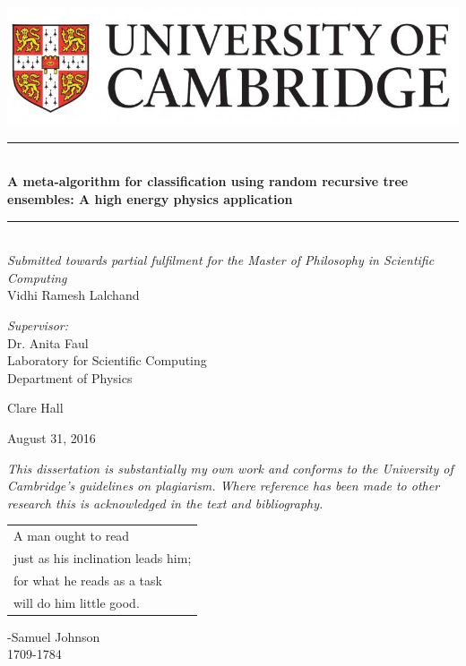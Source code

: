 \documentclass[a4paper,twoside]{report}
\newcommand\textline[4][t]{%
  \par\smallskip\noindent\parbox[#1]{.600\textwidth}{\raggedright #2}%
  \parbox[#1]{.333\textwidth}{\centering#3}%
  \parbox[#1]{.333\textwidth}{\raggedleft #4}\par\smallskip%
}
\begin{document}
\begin{titlepage}
\begin{center}

\includegraphics[scale=0.3]{images/Camlogo.jpg}

\vspace{15mm}
\noindent\rule{14cm}{0.4pt}
\vspace{0.1pt}\\
\textbf{\Large A meta-algorithm for classification using random recursive tree ensembles: A high energy physics application}
\vspace{0.1pt}\\
\noindent\rule{14cm}{0.4pt}\\
\vspace{20mm}
\textit{Submitted towards partial fulfilment for the Master of Philosophy in Scientific Computing}\\
\vspace{30mm}
\large{Vidhi Ramesh Lalchand}\\
\vspace{6mm}
\end{center}
\vspace{45mm}
\textline[t]{
\textit{Supervisor:} \\
Dr. Anita Faul \\
Laboratory for Scientific Computing\\
Department of Physics\\
}{}{Clare Hall}
\vspace{10mm}
\begin{center}
August 31, 2016
\end{center}
\end{titlepage}

\thispagestyle{empty}
\textit{This dissertation is substantially my own work and conforms to the University of Cambridge's guidelines on plagiarism. Where reference has been made to other research this is acknowledged in the text and bibliography.}
\clearpage

\thispagestyle{empty}
\null\vfill
\begin{center}
\begin{tabular}{l}
  A man ought to read \\ 
  just as his inclination leads him; \\
  for what he reads as a task \\ 
  will do him little good.\par
 \end{tabular}
 
  \textup{\hspace{35mm} -Samuel Johnson \\\hspace{28mm}1709-1784}
   \end{center} 
\vfill\vfill
\clearpage
\end{document}
